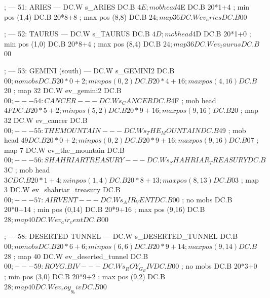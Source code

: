 \documentclass[10pt]{report}
\begin{document}
    ; --- 51: ARIES ---
    DC.W s_ARIES
    DC.B $4E                     ; mob head $4E
    DC.B 20*1+4                  ; min pos (1,4)
    DC.B 20*8+8                  ; max pos (8,8)
    DC.B $24                     ; map 36
    DC.W ev_aries
    DC.B $00

    ; --- 52: TAURUS ---
    DC.W s_TAURUS
    DC.B $4D                     ; mob head $4D
    DC.B 20*1+0                  ; min pos (1,0)
    DC.B 20*8+4                  ; max pos (8,4)
    DC.B $24                     ; map 36
    DC.W ev_taurus
    DC.B $00

    ; --- 53: GEMINI (south) ---
    DC.W s_GEMINI2
    DC.B $00                     ; no mobs
    DC.B 20*0+2                  ; min pos (0,2)
    DC.B 20*4+16                 ; max pos (4,16)
    DC.B $20                     ; map 32
    DC.W ev_gemini2
    DC.B $00

    ; --- 54: CANCER ---
    DC.W s_CANCER
    DC.B $4F                     ; mob head $4F
    DC.B 20*5+2                  ; min pos (5,2)
    DC.B 20*9+16                 ; max pos (9,16)
    DC.B $20                     ; map 32
    DC.W ev_cancer
    DC.B $00

    ; --- 55: THE MOUNTAIN ---
    DC.W s_THE_MOUNTAIN
    DC.B $49                     ; mob head $49
    DC.B 20*0+2                  ; min pos (0,2)
    DC.B 20*9+16                 ; max pos (9,16)
    DC.B $07                     ; map 7
    DC.W ev_the_mountain
    DC.B $00

    ; --- 56: SHAHRIAR TREASURY ---
    DC.W s_SHAHRIAR_TREASURY
    DC.B $3C                     ; mob head $3C
    DC.B 20*1+4                  ; min pos (1,4)
    DC.B 20*8+13                 ; max pos (8,13)
    DC.B $03                     ; map 3
    DC.W ev_shahriar_treasury
    DC.B $00

    ; --- 57: AIR VENT ---
    DC.W s_AIR_VENT
    DC.B $00                     ; no mobs
    DC.B 20*0+14                 ; min pos (0,14)
    DC.B 20*9+16                 ; max pos (9,16)
    DC.B $28                     ; map 40
    DC.W ev_air_vent
    DC.B $00

    ; --- 58: DESERTED TUNNEL ---
    DC.W s_DESERTED_TUNNEL
    DC.B $00                     ; no mobs
    DC.B 20*6+6                  ; min pos (6,6)
    DC.B 20*9+14                 ; max pos (9,14)
    DC.B $28                     ; map 40
    DC.W ev_deserted_tunnel
    DC.B $00

    ; --- 59: ROY G. BIV ---
    DC.W s_ROY_G_BIV
    DC.B $00                     ; no mobs
    DC.B 20*3+0                  ; min pos (3,0)
    DC.B 20*9+2                  ; max pos (9,2)
    DC.B $28                     ; map 40
    DC.W ev_roy_g_biv
    DC.B $00
\end{document}
